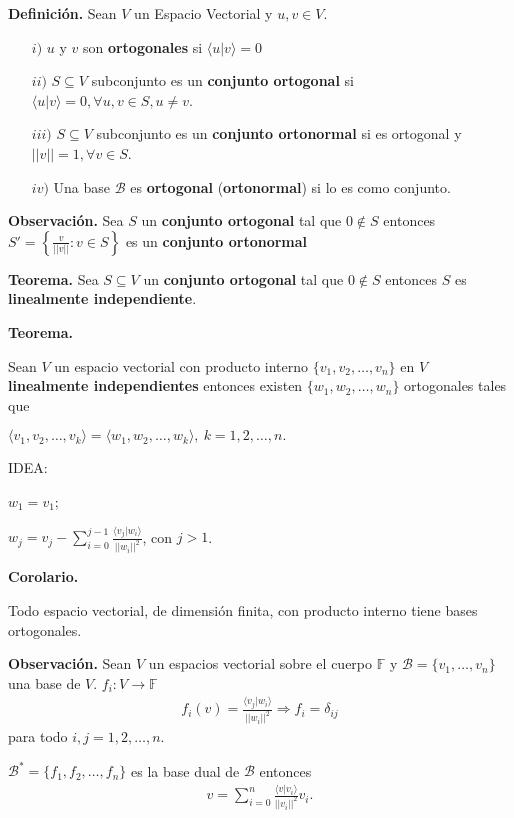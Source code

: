 \newpage


\textbf{Definición.} Sean $V$ un Espacio Vectorial y $u, v \in V$.

\begin{itemize}
    \item[$i)$] $u$ y $v$ son \textbf{ortogonales} si $\langle u|v \rangle = 0$
    \item[$ii)$] $S \subseteq V$ subconjunto es un \textbf{conjunto ortogonal} si
                 $\langle u|v \rangle = 0, \forall u, v \in S, u \not = v$.
    \item[$iii)$] $S \subseteq V$ subconjunto es un \textbf{conjunto ortonormal} si 
                 es ortogonal y $||v|| = 1, \forall v \in S$.
    \item[$iv)$] Una base $\mathcal{B}$ es \textbf{ortogonal} (\textbf{ortonormal})
                 si lo es como conjunto.
\end{itemize}

\textbf{Observación.} Sea $S$ un \textbf{conjunto ortogonal} tal que $0 \not\in S$ entonces
$S'=\left\{ \frac{v}{||v||}:v \in S \right\}$ es un \textbf{conjunto ortonormal} 

\textbf{Teorema.} Sea $S \subseteq V$ un \textbf{conjunto ortogonal}
tal que $0 \not\in S$ entonces $S$ es \textbf{linealmente independiente}.

\textbf{Teorema.}

Sean $V$ un espacio vectorial con producto interno $\{v_{1},
v_{2}, \dots, v_{n}\}$ en $V$ \textbf{linealmente independientes}
entonces existen $\{w_{1}, w_{2}, \dots, w_{n}\}$ ortogonales tales que

$\langle v_{1}, v_{2}, \dots, v_{k} \rangle=\langle w_{1}, w_{2}, \dots, w_{k} \rangle,~k=1,2,\dots, n.$

IDEA:

$w_{1}=v_{1}$;

$w_{j}=v_{j}-\displaystyle{\sum_{i=0}^{j-1}}\frac{\langle v_{j}|w_{i} \rangle}{||w_{i}||^2}$, con $j>1$.

\textbf{Corolario.}

Todo espacio vectorial, de dimensión finita, con producto interno tiene bases
ortogonales.

\textbf{Observación.} Sean $V$ un espacios vectorial sobre el 
cuerpo $\mathbb{F}$ y $\mathcal{B}=\{v_{1},\dots,v_{n}\}$ una base de $V$.
$f_{i}:V\to \mathbb{F}$
\begin{align*}
	f_{i}(v) = \frac{\langle v_{j}|w_{i} \rangle}{||w_{i}||^2}
	\Rightarrow f_{i}=\delta_{ij}
\end{align*}
para todo $i, j = 1, 2, \dots, n$.

$\mathcal{B}^{\ast}=\{f_{1}, f_{2}, \dots, f_{n}\}$ es la base dual de $\mathcal{B}$
entonces 
\begin{align*}
	v=\displaystyle{\sum_{i=0}^{n}} \frac{\langle v|v_{i} \rangle}{||v_{i}||^2}v_{i}.
\end{align*}